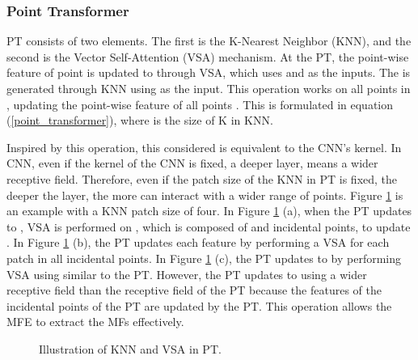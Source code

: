 \documentclass{article}
\begin{document}
\begin{center}

\end{center}

\subsubsection{Point Transformer} \quad PT consists of two elements. The first is the K-Nearest Neighbor (KNN), and the second is the Vector Self-Attention (VSA) mechanism. At the  PT, the point-wise feature  of point  is updated to  through VSA, which uses  and  as the inputs. The  is generated through KNN using  as the input. This operation works on all points in , updating the point-wise feature of all points \cite{zhao2021point}. This is formulated in equation (\ref{point_transformer}), where  is the size of K in KNN.
\begin{center}

\end{center}
\quad Inspired by this operation, this considered  is equivalent to the CNN's kernel. In CNN, even if the kernel of the CNN is fixed, a deeper layer, means a wider receptive field. Therefore, even if the patch size of the KNN in PT is fixed, the deeper the layer, the more  can interact with a wider range of points. Figure \ref{fig:knn_operation} is an example with a KNN patch size of four. In Figure \ref{fig:knn_operation} (a), when the  PT updates  to , VSA is performed on , which is composed of  and incidental points, to update . In Figure \ref{fig:knn_operation} (b), the  PT updates each feature by performing a VSA for each patch in all incidental points. In Figure \ref{fig:knn_operation} (c), the  PT updates  to  by performing VSA using  similar to the  PT. However, the  PT updates  to  using a wider receptive field than the receptive field of the  PT because the features of the incidental points of the  PT are updated by the  PT. This operation allows the MFE to extract the MFs effectively.

\begin{figure}[htb!]
  \centering
  \quad
\caption{Illustration of KNN and VSA in PT.}
\label{fig:knn_operation}
\end{figure}
\end{document}
